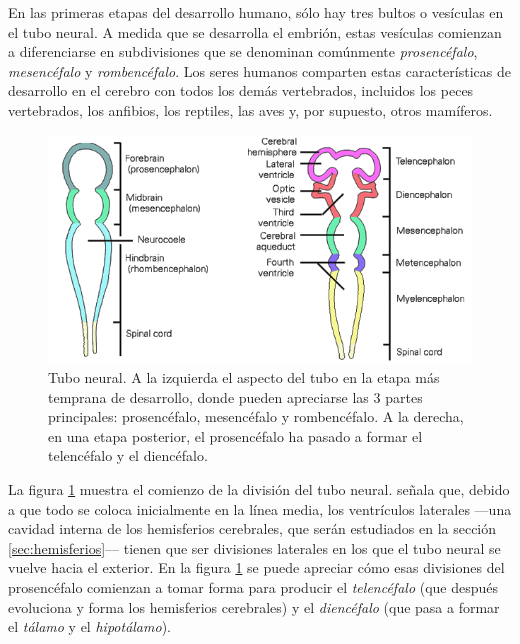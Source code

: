 En las primeras etapas del desarrollo humano, sólo hay tres bultos o vesículas en el tubo neural. A medida que se desarrolla el embrión, estas vesículas comienzan a diferenciarse en subdivisiones que se denominan comúnmente {\it prosencéfalo}, {\it mesencéfalo} y {\it rombencéfalo}. Los seres humanos comparten estas características de desarrollo en el cerebro con todos los demás vertebrados, incluidos los peces vertebrados, los anfibios, los reptiles, las aves y, por supuesto, otros mamíferos.


\begin{figure}[h]
  \begin{center}
    \includegraphics[width=\textwidth]{images/tubo-neural.png}
    \caption[Tubo neural]{Tubo neural. A la izquierda el aspecto del tubo en la etapa más temprana de desarrollo, donde pueden apreciarse las 3 partes principales: prosencéfalo, mesencéfalo y rombencéfalo. A la derecha, en una etapa posterior, el prosencéfalo ha pasado a formar el telencéfalo y el diencéfalo.}
    \label{tubo-neural}
  \end{center}
\end{figure}

La figura \ref{tubo-neural} muestra el comienzo de la división del tubo neural. \cite{Lautin2001} señala que, debido a que todo se coloca inicialmente en la línea media, los ventrículos laterales ---una cavidad interna de los hemisferios cerebrales, que serán estudiados en la sección \ref{sec:hemisferios}--- tienen que ser divisiones laterales en los que el tubo neural se vuelve hacia el exterior. En la figura \ref{tubo-neural} se puede apreciar cómo esas divisiones del prosencéfalo comienzan a tomar forma para producir el {\it telencéfalo} (que después evoluciona y forma los hemisferios cerebrales) y el {\it diencéfalo} (que pasa a formar el {\it tálamo} y el {\it hipotálamo}).


